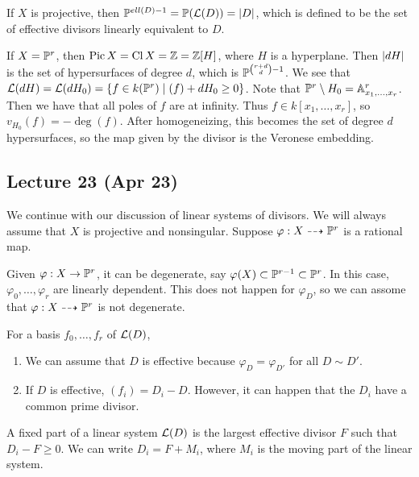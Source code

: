 \documentclass[twoside, 10pt]{article}
\begin{document}
        If $X$ is projective, then $\P^{ell(D)-1} = \P(\mc{L}(D)) = \abs{D}$,
        which is defined to be the set of effective divisors linearly
        equivalent to $D$.

        \begin{exm} If $X= \P^r$, then $\operatorname{Pic}X =
            \operatorname{Cl}X = \Z = \Z[H]$, where $H$ is a hyperplane. Then
            $\abs{dH}$ is the set of hypersurfaces of degree $d$, which is
            $\P^{\binom{r+d}{d}-1}$. We see that $\mc{L}(dH) = \mc{L}(dH_0) =
            \{f \in k(\P^r) \mid (f) + dH_0 \geq 0 \}$. Note that $\P^r
            \setminus H_0 = \A^r_{x_1, \ldots, x_r}$. Then we have that all
            poles of $f$ are at infinity. Thus $f \in k[x_1, \ldots, x_r]$, so
            $v_{H_0}(f) = - \operatorname{deg}(f)$. After homogeneizing, this
        becomes the set of degree $d$ hypersurfaces, so the map given by the
    divisor is the Veronese embedding.  \end{exm}
        
        \subsection{Lecture 23 (Apr 23)} We continue with our discussion of
        linear systems of divisors. We will always assume that $X$ is
        projective and nonsingular. Suppose $\varphi:X \dashrightarrow \P^r$ is
        a rational map.

        \begin{rmk} Given $\varphi:X \to \P^r$, it can be degenerate, say
            $\varphi(X) \subset \P^{r-1} \subset \P^r$. In this case,
            $\varphi_0, \ldots, \varphi_r$ are linearly dependent. This does
            not happen for $\varphi_D$, so we can assome that $\varphi:X
            \dashrightarrow \P^r$ is not degenerate.  \end{rmk}

        For a basis $f_0, \ldots, f_r$ of $\mc{L}(D)$, \begin{enumerate} \item
            We can assume that $D$ is effective because $\varphi_D =
            \varphi_{D'}$ for all $D \sim D'$.  \item If $D$ is effective,
            $(f_i) = D_i - D$. However, it can happen that the $D_i$ have a
            common prime divisor.  \end{enumerate}

        \begin{defn} A fixed part of a linear system $\mc{L}(D)$ is
        the largest effective divisor $F$ such that $D_i - F \geq 0$. We can
    write $D_i = F+M_i$, where $M_i$ is the moving part of the linear system.
\end{defn}
\end{document}
